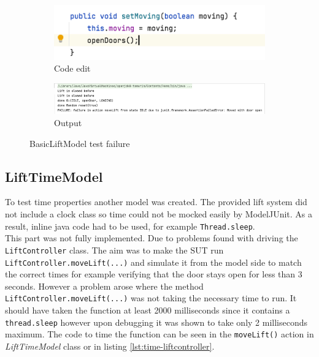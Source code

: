 \documentclass[a4paper, 12pt]{article}
\begin{document}
\begin{figure}
\centering
\begin{subfigure}{.5\textwidth}
  \centering
  \includegraphics[width=\linewidth]{images/BasicLiftModel-fail-code}
  \caption{Code edit}
\end{subfigure}%
\begin{subfigure}{.5\textwidth}
  \centering
  \includegraphics[width=\linewidth]{images/BasicLiftModel-fail-output}
  \caption{Output}
\end{subfigure}
\caption{BasicLiftModel test failure}
\label{fig:BasicLiftModel-fail}
\end{figure}

\subsection{LiftTimeModel}
To test time properties another model was created. The provided lift system did not include a clock class so time could not be mocked easily by ModelJUnit. As a result, inline java code had to be used, for example \texttt{Thread.sleep}. \\

This part was not fully implemented. Due to problems found with driving the \texttt{LiftController} class. The aim was to make the SUT run \texttt{LiftController.moveLift(...)} and simulate it from the model side to match the correct times for example verifying that the door stays open for less than 3 seconds. However a problem arose where the method \texttt{LiftController.moveLift(...)} was not taking the necessary time to run. It should have taken the function at least 2000 milliseconds since it contains a \texttt{thread.sleep} however upon debugging it was shown to take only 2 milliseconds maximum. The code to time the function can be seen in the \texttt{moveLift()} action in \textit{LiftTimeModel} class or in listing \ref{lst:time-liftcontroller}.
\end{document}
